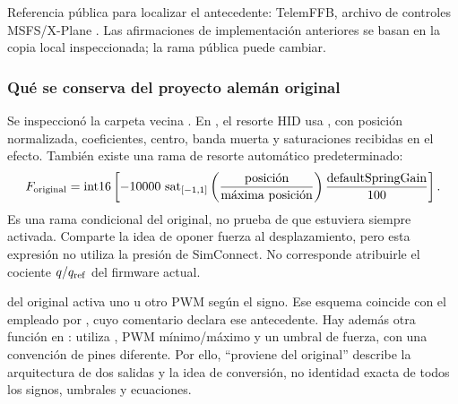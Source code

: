 Referencia pública para localizar el antecedente: TelemFFB, archivo de controles MSFS/X-Plane \cite{telemffb}. Las afirmaciones de implementación anteriores se basan en la copia local inspeccionada; la rama pública puede cambiar.

\subsubsection{Qué se conserva del proyecto alemán original}
Se inspeccionó la carpeta vecina . En , el resorte HID usa , con posición normalizada, coeficientes, centro, banda muerta y saturaciones recibidas en el efecto. También existe una rama de resorte automático predeterminado:
\begin{equation}
F_{\rm original}=\operatorname{int16}\left[-10000\,
\operatorname{sat}_{[-1,1]}\left(\frac{\text{posición}}{\text{máxima posición}}\right)
\frac{\text{defaultSpringGain}}{100}\right].
\end{equation}
Es una rama condicional del original, no prueba de que estuviera siempre activada. Comparte la idea de oponer fuerza al desplazamiento, pero esta expresión no utiliza la presión de SimConnect. No corresponde atribuirle el cociente $q/q_{\rm ref}$ del firmware actual.

 del original activa uno u otro PWM según el signo. Ese esquema coincide con el empleado por , cuyo comentario declara ese antecedente. Hay además otra función  en : utiliza , PWM mínimo/máximo y un umbral de fuerza, con una convención de pines diferente. Por ello, ``proviene del original'' describe la arquitectura de dos salidas y la idea de conversión, no identidad exacta de todos los signos, umbrales y ecuaciones.

